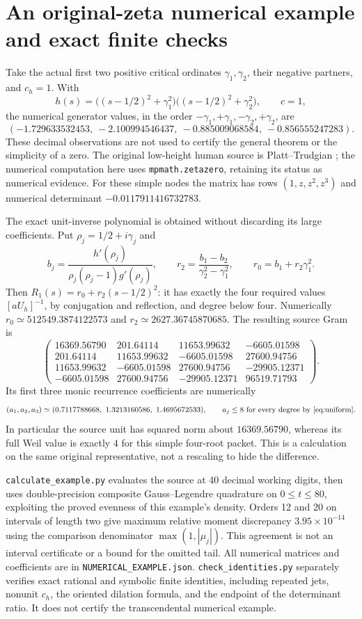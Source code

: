 \documentclass[11pt]{article}
\begin{document}
\section{An original-zeta numerical example and exact finite checks}
Take the actual first two positive critical ordinates $\gamma_1,\gamma_2$,
their negative partners, and $c_h=1$. With
\[
 h(s)=\bigl((s-1/2)^2+\gamma_1^2\bigr)
      \bigl((s-1/2)^2+\gamma_2^2\bigr),\qquad c=1,
\]
the numerical generator values, in the order
$-\gamma_1,+\gamma_1,-\gamma_2,+\gamma_2$, are
\[
 (-1.729633532453,\ -2.100994546437,\
   -0.885009068584,\ -0.856555247283).
\]
These decimal observations are not used to certify the general theorem
or the simplicity of a zero. The original low-height human source is
Platt--Trudgian \cite{Platt}; the numerical computation here uses
\texttt{mpmath.zetazero}, retaining its status as numerical evidence.
For these simple nodes the matrix has rows $(1,z,z^2,z^3)$ and
numerical determinant $-0.0117911416732783$.

The exact unit-inverse polynomial is obtained without discarding its
large coefficients. Put $\rho_j=1/2+i\gamma_j$ and
\[
 b_j=\frac{h'(\rho_j)}{\rho_j(\rho_j-1)g'(\rho_j)},\qquad
 r_2=\frac{b_1-b_2}{\gamma_2^2-\gamma_1^2},\qquad
 r_0=b_1+r_2\gamma_1^2.
\]
Then $R_1(s)=r_0+r_2(s-1/2)^2$: it has exactly the four required
values $[aU_h]^{-1}$, by conjugation and reflection, and degree below
four. Numerically $r_0\simeq512549.3874122573$ and
$r_2\simeq2627.36745870685$. The resulting source Gram is
\[
 \begin{pmatrix}
 16369.56790&201.64114&11653.99632&-6605.01598\\
 201.64114&11653.99632&-6605.01598&27600.94756\\
 11653.99632&-6605.01598&27600.94756&-29905.12371\\
 -6605.01598&27600.94756&-29905.12371&96519.71793
 \end{pmatrix}.
\]
Its first three monic recurrence coefficients are numerically
\[
 (a_1,a_2,a_3)\simeq(0.7117788668,\ 1.3213160586,\ 1.4695672533),
 \qquad a_j\le8\text{ for every degree by \eqref{eq:uniform}}.
\]
In particular the source unit has squared norm about $16369.56790$,
whereas its full Weil value is exactly $4$ for this simple four-root
packet. This is a calculation on the same original representative,
not a rescaling to hide the difference.

\texttt{calculate\_example.py} evaluates the source at 40 decimal
working digits, then uses double-precision composite Gauss--Legendre
quadrature on $0\le t\le80$, exploiting the proved evenness of this
example's density. Orders 12 and 20 on intervals of length two give
maximum relative moment discrepancy $3.95\times10^{-14}$ using the
comparison denominator $\max(1,|\mu_j|)$. This agreement is not an
interval certificate or a bound for the omitted tail. All numerical
matrices and coefficients are in \texttt{NUMERICAL\_EXAMPLE.json}.
\texttt{check\_identities.py} separately verifies exact rational and
symbolic finite identities, including repeated jets, nonunit $c_h$,
the oriented dilation formula, and the endpoint of the determinant
ratio. It does not certify the transcendental numerical example.
\end{document}
